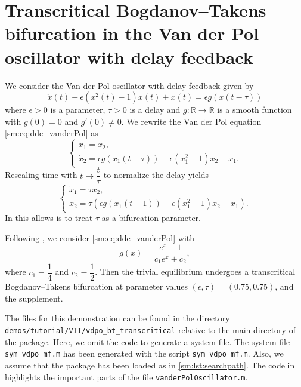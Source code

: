 \section[the Van der Pol oscillator with delay feedback]
        {Transcritical Bogdanov--Takens bifurcation in the Van der Pol oscillator with delay feedback}
We consider the Van der Pol oscillator with delay feedback \cite{jiang2007bogdanov}
given by 
\begin{equation}
\ddot{x}(t) + \epsilon(x^2(t)-1)\dot{x}(t) + x(t) = \epsilon g(x(t-\tau))\label{sm:eq:dde_vanderPol}
\end{equation}
where $\epsilon>0$ is a parameter, $\tau>0$ is a delay and $g:\mathbb{R}\rightarrow\mathbb{R}$
is a smooth function with $g(0) = 0$ and $g'(0)\neq0$. We rewrite
the Van der Pol equation \cref{sm:eq:dde_vanderPol} as
\begin{equation}
\label{sm:eq:vanderPolOscillator}
\begin{cases}
    \dot{x}_1 = x_2,\\
    \dot{x}_2 = \epsilon g(x_1(t-\tau))-\epsilon(x_1^2-1)x_2-x_1.
\end{cases}
\end{equation}
Rescaling time with $t\rightarrow\dfrac{t}{\tau}$ to normalize the
delay yields
\begin{equation}
\label{sm:eq:vanderPolOscillatorRescaled}
\begin{cases}
\dot{x}_1 = \tau x_2,\\
\dot{x}_2 = \tau\left(\epsilon g(x_1(t-1))-\epsilon(x_1^2-1)x_2-x_1\right).
\end{cases}
\end{equation}
In this allows is to treat $\tau$ as a bifurcation parameter.

Following \cite{jiang2007bogdanov}, we consider \cref{sm:eq:dde_vanderPol} with
\[
g(x) = \frac{e^x-1}{c_1e^x + c_2},
\]
where $c_1 = \dfrac{1}{4}$ and $c_2 = \dfrac{1}{2}$. Then the trivial
equilibrium undergoes a transcritical Bogdanov--Takens bifurcation at parameter
values $(\epsilon,\tau) = (0.75,0.75)$, \cite{jiang2007bogdanov} and the
supplement. 

\begin{remark}
    The \MATLAB files for this demonstration can be found in the directory
    \texttt{demos/tutorial/VII/vdpo_bt_transcritical} relative to the main
    directory of the \DDEBIFTOOL package. Here, we omit the code to generate a
    system file. The system file \texttt{sym_vdpo_mf.m} has been generated
    with the script \texttt{sym_vdpo_mf.m}. Also, we assume that the
    \DDEBIFTOOL package has been loaded as in \cref{sm:lst:searchpath}. The
    code in
    highlights the important parts of the file
    \texttt{vanderPolOscillator.m}. 
\end{remark}

